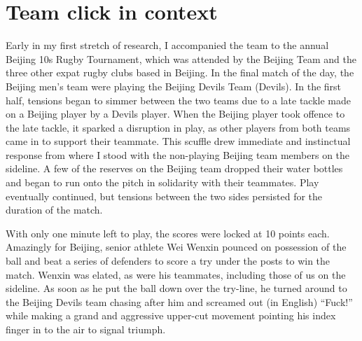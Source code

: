 
\begin{savequote}[8cm]

  \qauthor{}
\end{savequote}



\chapter{Team click in context \label{chap:ethnoResults}}

\minitoc






                                      \begin{CJK}{UTF8}{gbsn}





Early in my first stretch of research, I accompanied the team to the annual Beijing 10s Rugby Tournament, which was attended by the Beijing Team and the three other expat rugby clubs based in Beijing.  In the final match of the day, the Beijing men's team were playing the Beijing Devils Team (Devils).  In the first half, tensions began to simmer between the two teams due to a late tackle made on a Beijing player by a Devils player.  When the Beijing player took offence to the late tackle, it sparked a disruption in play, as other players from both teams came in to support their teammate.  This scuffle drew immediate and instinctual response from where I stood with the non-playing Beijing team members on the sideline.  A few of the reserves on the Beijing team dropped their water bottles and began to run onto the pitch in solidarity with their teammates.  Play eventually continued, but tensions between the two sides persisted for the duration of the match.

With only one minute left to play, the scores were locked at 10 points each.  Amazingly for Beijing, senior athlete Wei Wenxin pounced on possession of the ball and beat a series of defenders to score a try under the posts to win the match.  Wenxin was elated, as were his teammates, including those of us on the sideline.  As soon as he put the ball down over the try-line, he turned around to the Beijing Devils team chasing after him and screamed out (in English) ``Fuck!'' while making a grand and aggressive upper-cut movement pointing his index finger in to the air to signal triumph.


\end{CJK}
